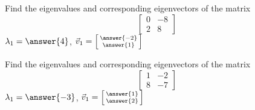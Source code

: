 \documentclass{ximera}
\begin{document}
\begin{exercise}%
    Find the eigenvalues and corresponding eigenvectors of the matrix 
    \[ 
        \begin{bmatrix} 
        0 & -8 \\ 
        2 & 8 
        \end{bmatrix} 
    \]
    $\lambda_1 = \answer{4}$, $\vec{v}_1 = \left[\begin{smallmatrix} \answer{-2} \\ \answer{1} \end{smallmatrix}\right]$
\end{exercise}

\begin{exercise}%
    Find the eigenvalues and corresponding eigenvectors of the matrix 
    \[ 
        \begin{bmatrix} 
        1 & -2 \\ 
        8 & -7 
        \end{bmatrix} 
    \]
    $\lambda_1 = \answer{-3}$, $\vec{v}_1 = \left[\begin{smallmatrix} \answer{1} \\ \answer{2} \end{smallmatrix}\right]$
\end{exercise}
\end{document}
